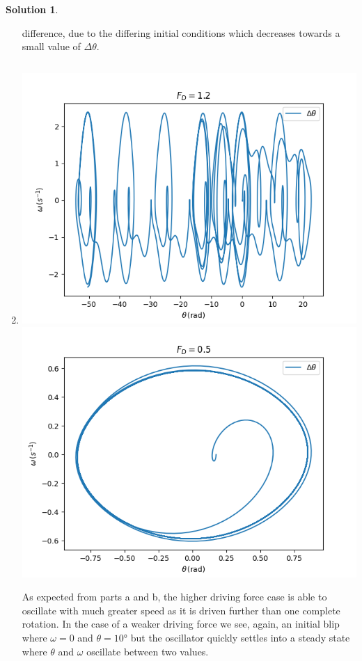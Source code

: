 \documentclass[10pt]{article}
\theoremstyle{definition}
\newtheorem{soln}{Solution}
\begin{document}
\begin{soln}
\begin{enumerate}[label=(\alph*)]
                  difference, due to the differing initial conditions which decreases towards a small value of $\Delta \theta$. 
            \item \inputminted[breaklines, autogobble]{python3}{./python/q2/q2c.py}
                  \begin{center}
                        \includegraphics[scale=0.75]{Figure_7-1.png}
                        \includegraphics[scale=0.75]{Figure_7-2.png}
                  \end{center}
                  As expected from parts a and b, the higher driving force case is able to oscillate with much greater speed as it is driven further than one complete rotation.
                  In the case of a weaker driving force we see, again, an initial blip where $\omega=0$ and $\theta=10\unit{\degree}$ but the oscillator quickly settles into a steady
                  state where $\theta$ and $\omega$ oscillate between two values.
      \end{enumerate}
\end{soln}
\end{document}
